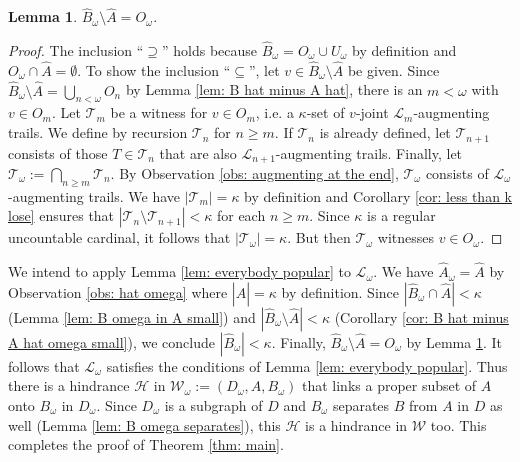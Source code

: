 \documentclass[12pt,a4paper]{amsart}
\theoremstyle{plain}
\newtheorem{lemma}[theorem]{Lemma}
\theoremstyle{definition}
\begin{document}
\begin{lemma}\label{lem: popular at the end}
$ \widehat{B}_{\omega}\setminus 
\widehat{A}=O_\omega $.
\end{lemma}
\begin{proof}
The inclusion ``$ \supseteq $'' holds because $ \widehat{B}_{\omega}=O_\omega\cup U_\omega $ by definition and $ O_\omega \cap 
\widehat{A}=\emptyset $. To show the inclusion ``$ \subseteq $'', let $ v\in \widehat{B}_{\omega}\setminus 
\widehat{A} $ be given. Since $ \widehat{B}_\omega\setminus \widehat{A}=\bigcup_{n<\omega}O_n $ by Lemma \ref{lem: B hat minus A 
hat}, there is an $ m<\omega $ with $ v\in O_m $. Let $ \mathcal{T}_m $ be a witness for $ v\in O_m $, i.e. a  $ \kappa $-set of $ v $-joint  $ 
\mathcal{L}_m $-augmenting trails. We define by recursion $ \mathcal{T}_n $ for $ n \geq m $. If $ \mathcal{T}_n $ is 
already defined, let $ \mathcal{T}_{n+1} $ consists of those $ 
T\in \mathcal{T}_n $ that are also $ \mathcal{L}_{n+1} $-augmenting trails. Finally, let $ \mathcal{T}_\omega:= 
\bigcap_{n 
\geq m}\mathcal{T}_n 
$. By Observation \ref{obs: augmenting at the end}, $ \mathcal{T}_\omega $ consists of $ \mathcal{L}_\omega 
$-augmenting trails.   We have $ \left|\mathcal{T}_m\right|=\kappa $ by definition and Corollary
\ref{cor: less than k lose} ensures that $ \left|\mathcal{T}_n\setminus \mathcal{T}_{n+1}\right|<\kappa $ for each $ n \geq m 
$.  Since $ \kappa $ is a regular uncountable cardinal, it follows that $ \left|\mathcal{T}_\omega\right|=\kappa $. But then $ 
\mathcal{T}_\omega $ witnesses $ v\in O_\omega $.
\end{proof}
We intend to apply Lemma \ref{lem: everybody popular} to $ \mathcal{L}_\omega $. We have $ 
\widehat{A}_\omega=\widehat{A} $ by Observation \ref{obs: hat omega} where $ \left|\widehat{A} \right|=\kappa$ by 
definition. Since
$ \left|\widehat{B}_\omega \cap \widehat{A}\right|<\kappa $ (Lemma \ref{lem: B omega in A small}) and $ 
\left|\widehat{B}_\omega\setminus 
\widehat{A}\right|<\kappa $ (Corollary \ref{cor: B hat minus A hat omega small}), 
we conclude $ \left|\widehat{B}_\omega\right|<\kappa $. Finally, $ \widehat{B}_{\omega}\setminus 
\widehat{A}=O_\omega $ by Lemma \ref{lem: popular at the end}. It follows that $ 
\mathcal{L}_\omega $ satisfies the conditions of Lemma \ref{lem: everybody popular}. Thus there is a hindrance $ 
\mathcal{H} $ in $ 
\mathcal{W}_\omega:=(D_\omega,A,B_\omega) $ that links a proper subset of $ A 
$ onto $ B_\omega $ in $ D_\omega $. Since $ D_\omega $ is a subgraph of $ D $ and  $ B_\omega $
separates $ B $ 
from $ A $ in $ D $ as well (Lemma \ref{lem: B omega separates}), this $ \mathcal{H} $ is a hindrance in $ \mathcal{W} $ 
too. This completes the proof of Theorem \ref{thm: main}.
\end{document}
